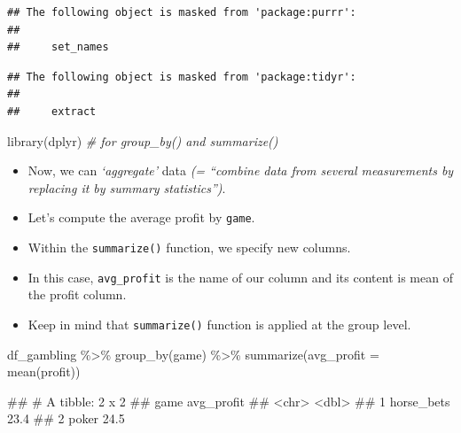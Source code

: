 \documentclass[
]{book}
\newenvironment{Shaded}{\begin{snugshade}}{\end{snugshade}}
\newcommand{\AttributeTok}[1]{\textcolor[rgb]{0.77,0.63,0.00}{#1}}
\newcommand{\CommentTok}[1]{\textcolor[rgb]{0.56,0.35,0.01}{\textit{#1}}}
\newcommand{\FunctionTok}[1]{\textcolor[rgb]{0.00,0.00,0.00}{#1}}
\newcommand{\NormalTok}[1]{#1}
\newcommand{\SpecialCharTok}[1]{\textcolor[rgb]{0.00,0.00,0.00}{#1}}
\begin{document}
\begin{verbatim}
## The following object is masked from 'package:purrr':
## 
##     set_names
\end{verbatim}

\begin{verbatim}
## The following object is masked from 'package:tidyr':
## 
##     extract
\end{verbatim}

\begin{Shaded}
\begin{Highlighting}[]
\FunctionTok{library}\NormalTok{(dplyr) }\CommentTok{\# for group\_by() and summarize()}
\end{Highlighting}
\end{Shaded}

\begin{itemize}
\item
  Now, we can \emph{`aggregate'} data \emph{(= ``combine data from several measurements by replacing it by summary statistics'')}.
\item
  Let's compute the average profit by \texttt{game}.
\item
  Within the \texttt{summarize()} function, we specify new columns.
\item
  In this case, \texttt{avg\_profit} is the name of our column and its content is mean of the profit column.
\item
  Keep in mind that \texttt{summarize()} function is applied at the group level.
\end{itemize}

\begin{Shaded}
\begin{Highlighting}[]
\NormalTok{df\_gambling }\SpecialCharTok{\%\textgreater{}\%} 
  \FunctionTok{group\_by}\NormalTok{(game) }\SpecialCharTok{\%\textgreater{}\%} 
  \FunctionTok{summarize}\NormalTok{(}\AttributeTok{avg\_profit =} \FunctionTok{mean}\NormalTok{(profit))}
\end{Highlighting}
\end{Shaded}

\begin{Shaded}
\begin{Highlighting}[]
\NormalTok{\#\# \# A tibble: 2 x 2}
\NormalTok{\#\#   game       avg\_profit}
\NormalTok{\#\#   \textless{}chr\textgreater{}           \textless{}dbl\textgreater{}}
\NormalTok{\#\# 1 horse\_bets       23.4}
\NormalTok{\#\# 2 poker            24.5}
\end{Highlighting}
\end{Shaded}
\end{document}
